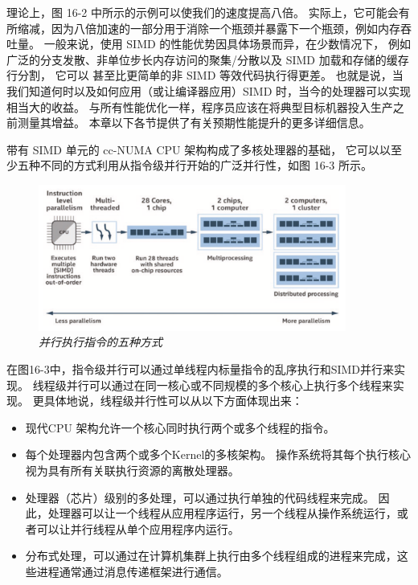 理论上，图 16-2 中所示的示例可以使我们的速度提高八倍。 
实际上，它可能会有所缩减，因为八倍加速的一部分用于消除一个瓶颈并暴露下一个瓶颈，例如内存吞吐量。 
一般来说，使用 SIMD 的性能优势因具体场景而异，在少数情况下，
例如广泛的分支发散、非单位步长内存访问的聚集/分散以及 SIMD 加载和存储的缓存行分割，
它可以 甚至比更简单的非 SIMD 等效代码执行得更差。 
也就是说，当我们知道何时以及如何应用（或让编译器应用）SIMD 时，当今的处理器可以实现相当大的收益。 
与所有性能优化一样，程序员应该在将典型目标机器投入生产之前测量其增益。 
本章以下各节提供了有关预期性能提升的更多详细信息。

带有 SIMD 单元的 cc-NUMA CPU 架构构成了多核处理器的基础，
它可以以至少五种不同的方式利用从指令级并行开始的广泛并行性，如图 16-3 所示。

\begin{figure}[H]
	\centering
	\includegraphics[width=0.9\textwidth]{figs/F16.3.png}
	\caption{\textit{并行执行指令的五种方式 }}
\end{figure}

在图16-3中，指令级并行可以通过单线程内标量指令的乱序执行和SIMD并行来实现。 
线程级并行可以通过在同一核心或不同规模的多个核心上执行多个线程来实现。 
更具体地说，线程级并行性可以从以下方面体现出来：

\begin{itemize}
	\item 现代CPU 架构允许一个核心同时执行两个或多个线程的指令。

	\item 每个处理器内包含两个或多个Kernel的多核架构。 
	操作系统将其每个执行核心视为具有所有关联执行资源的离散处理器。

	\item 处理器（芯片）级别的多处理，可以通过执行单独的代码线程来完成。 
	因此，处理器可以让一个线程从应用程序运行，另一个线程从操作系统运行，或者可以让并行线程从单个应用程序内运行。

	\item 分布式处理，可以通过在计算机集群上执行由多个线程组成的进程来完成，这些进程通常通过消息传递框架进行通信。
\end{itemize}

